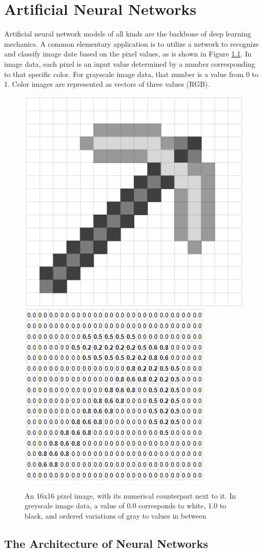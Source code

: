 \chapter{Artificial Neural Networks}



Artificial neural network models of all kinds are the backbone of deep learning mechanics.  A common elementary application is to utilize a network to recognize and classify image date based on the pixel values, as is shown in Figure \ref{minecraft}.  In image data, each pixel is an input value determined by a number corresponding to that specific color.  For grayscale image data, that number is a value from 0 to 1.  Color images are represented as vectors of three values (RGB).


\begin{figure}[H]
    \centering
    \includegraphics[width=.35\textwidth]{Figures/pickaxe_1.png}
    \hspace{30pt}
    \includegraphics[width=.35\textwidth]{Figures/pickaxe_2.png}
    \caption{\footnotesize{An 16x16 pixel image, with its numerical counterpart next to it.  In greyscale image data, a value of 0.0 corresponds to white, 1.0 to black, and ordered variations of gray to values in between}}
    \label{minecraft}
\end{figure}





\section{The Architecture of Neural Networks} %

